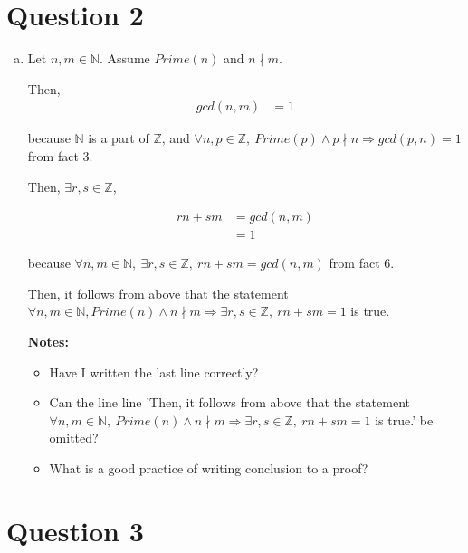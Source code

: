 \documentclass[12pt]{article}
\begin{document}
\begin{enumerate}
\begin{itemize}
    \end{itemize}


\end{enumerate}

\section*{Question 2}
\begin{enumerate}[a.]
    \item

    Let $n,m \in \mathbb{N}$. Assume $Prime(n)$ and $n \nmid m$.

    \bigskip

    Then,
    \setcounter{equation}{0}
    \begin{align}
        gcd(n,m) &= 1
    \end{align}

    because $\mathbb{N}$ is a part of $\mathbb{Z}$, and $\forall n,p \in \mathbb{Z},\:
    Prime(p) \land p \nmid n \Rightarrow gcd(p,n) = 1$ from fact 3.

    \bigskip

    Then, $\exists r, s \in \mathbb{Z}$,

    \begin{align}
        rn + sm &= gcd(n,m)\\
        &= 1
    \end{align}

    because $\forall n,m \in \mathbb{N},\:\exists r,s \in \mathbb{Z},\:rn + sm = gcd(n,m)$
    from fact 6.

    \bigskip

    Then, it follows from above that the statement $\forall n,m \in \mathbb{N},
    Prime(n) \land n \nmid m \Rightarrow \exists r,s \in \mathbb{Z},\:rn + sm = 1$ is true.

    \textbf{Notes:}
    \begin{itemize}
        \item Have I written the last line correctly?
        \item Can the line line 'Then, it follows from above that the statement
        $\forall n,m \in \mathbb{N},\:Prime(n) \land n \nmid m \Rightarrow \exists
        r,s \in \mathbb{Z},\:rn + sm = 1$ is true.' be omitted?

        \item What is a good practice of writing conclusion to a proof?
    \end{itemize}


\end{enumerate}

\section*{Question 3}
\end{document}
